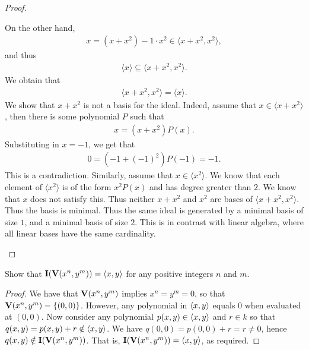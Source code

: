 \begin{proof}
\begin{enumerate}
    On the other hand,
    \begin{align*}
        x = (x+x^2) - 1\cdot x^2 \in \langle x+x^2, x^2\rangle,
    \end{align*}
    and thus
    \begin{align*}
        \langle x\rangle \subseteq \langle x+x^2, x^2\rangle.
    \end{align*}
    We obtain that
    \begin{align*}
        \langle x+x^2, x^2\rangle = \langle x\rangle.
    \end{align*}
    We show that $x+x^2$ is not a basis for the ideal. 
    Indeed, assume that $x\in \langle x+x^2\rangle$, then there is some polynomial $P$ such that
    \begin{align*}
        x = (x + x^2)P(x).
    \end{align*}
    Substituting in $x=-1$, we get that
    \begin{align*}
        0 = (-1 + (-1)^2)P(-1) = -1.
    \end{align*}
    This is a contradiction. 
    Similarly, assume that $x \in \langle x^2\rangle$. 
    We know that each element of $\langle x^2 \rangle$ is of the form $x^2 P(x)$ and has degree greater than $2$. 
    We know that $x$ does not satisfy this. 
    Thus neither $x+x^2$ and $x^2$ are bases of $\langle x+x^2, x^2\rangle$. 
    Thus the basis is minimal. 
    Thus the same ideal is generated by a minimal basis of size $1$, and a minimal basis of size $2$. 
    This is in contrast with linear algebra, where all linear bases have the same cardinality.
    \end{enumerate}
\end{proof}

\begin{exercise}{7}
Show that $\mathbf{I}(\mathbf{V}(x^n,y^m))=\langle x,y\rangle$ for any positive integers $n$ and $m$.
\end{exercise}
\begin{proof}
We have that $\mathbf{V}(x^n,y^m)$ implies $x^n=y^m=0$, so that $\mathbf{V}(x^n,y^m)=\{(0,0)\}$. 
However, any polynomial in $\langle x,y\rangle$ equals 0 when evaluated at $(0,0)$. 
Now consider any polynomial $p(x,y)\in\langle x,y\rangle$ and $r\in k$ so that $q(x,y)=p(x,y)+r\notin\langle x,y\rangle$. 
We have $q(0,0)=p(0,0)+r=r\neq 0$, hence $q(x,y)\notin\mathbf{I}(\mathbf{V}(x^n,y^m))$. 
That is, $\mathbf{I}(\mathbf{V}(x^n,y^m))=\langle x,y\rangle$, as required.
\end{proof}

